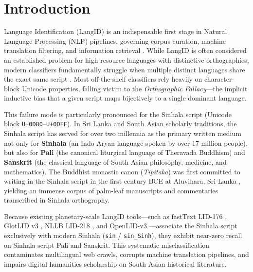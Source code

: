 \documentclass[11pt]{article}
\begin{document}
\section{Introduction}
Language Identification (LangID) is an indispensable first stage in Natural Language Processing (NLP) pipelines, governing corpus curation, machine translation filtering, and information retrieval \cite{jauhiainen2019automatic,lui2012langid,joulin2017bag,kargaran2023glotlid}. While LangID is often considered an established problem for high-resource languages with distinctive orthographies, modern classifiers fundamentally struggle when multiple distinct languages share the exact same script \cite{caswell2020language,dunn2023commonlid,burchell2023openlid}. Most off-the-shelf classifiers rely heavily on character-block Unicode properties, falling victim to the \textit{Orthographic Fallacy}—the implicit inductive bias that a given script maps bijectively to a single dominant language.

This failure mode is particularly pronounced for the Sinhala script (Unicode block \texttt{U+0D80}--\texttt{U+0DFF}). In Sri Lanka and South Asian scholarly traditions, the Sinhala script has served for over two millennia as the primary written medium not only for \textbf{Sinhala} (an Indo-Aryan language spoken by over 17 million people), but also for \textbf{Pali} (the canonical liturgical language of Theravada Buddhism) and \textbf{Sanskrit} (the classical language of South Asian philosophy, medicine, and mathematics). The Buddhist monastic canon (\textit{Tipitaka}) was first committed to writing in the Sinhala script in the first century BCE at Aluvihara, Sri Lanka \cite{norman1983pali}, yielding an immense corpus of palm-leaf manuscripts and commentaries transcribed in Sinhala orthography.

Because existing planetary-scale LangID tools—such as fastText LID-176 \cite{joulin2017bag}, GlotLID v3 \cite{kargaran2023glotlid}, NLLB LID-218 \cite{nllb2022}, and OpenLID-v3 \cite{burchell2023openlid}—associate the Sinhala script exclusively with modern Sinhala (\texttt{sin} / \texttt{sin\_Sinh}), they exhibit near-zero recall on Sinhala-script Pali and Sanskrit. This systematic misclassification contaminates multilingual web crawls, corrupts machine translation pipelines, and impairs digital humanities scholarship on South Asian historical literature.
\end{document}
